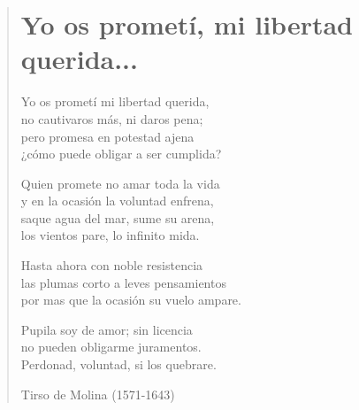 \documentclass[12pt, twoside]{book}
\begin{document}
\newpage
\begin{verse}
\begin{center}
\section{Yo os prometí, mi libertad querida...}
\end{center}
Yo os prometí mi libertad querida,\\
no cautivaros más, ni daros pena;\\
pero promesa en potestad ajena\\
¿cómo puede obligar a ser cumplida?
\newline

Quien promete no amar toda la vida\\
y en la ocasión la voluntad enfrena,\\
saque agua del mar, sume su arena,\\
los vientos pare, lo infinito mida.
\newline

Hasta ahora con noble resistencia\\
las plumas corto a leves pensamientos\\
por mas que la ocasión su vuelo ampare.
\newline

Pupila soy de amor; sin licencia\\
no pueden obligarme juramentos.\\
Perdonad, voluntad, si los quebrare.
\newline

Tirso de Molina (1571-1643)
\end{verse}
\end{document}

